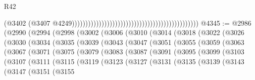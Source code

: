 \begin{lexlean}{R42}
\begin{coremodule}
{                                                                                              (@3402
                                                                                                (@3407
                                                                                                  @4249)))))))))))))))))))))))))))))))))))))))))))))))
@4345 := @2986
    (@2990
      (@2994
        (@2998
          (@3002
            (@3006
              (@3010
                (@3014
                  (@3018
                    (@3022
                      (@3026
                        (@3030
                          (@3034
                            (@3035
                              (@3039
                                (@3043
                                  (@3047
                                    (@3051
                                      (@3055
                                        (@3059
                                          (@3063
                                            (@3067
                                              (@3071
                                                (@3075
                                                  (@3079
                                                    (@3083
                                                      (@3087
                                                        (@3091
                                                          (@3095
                                                            (@3099
                                                              (@3103
                                                                (@3107
                                                                  (@3111
                                                                    (@3115
                                                                      (@3119
                                                                        (@3123
                                                                          (@3127
                                                                            (@3131
                                                                              (@3135
                                                                                (@3139
                                                                                  (@3143
                                                                                    (@3147
                                                                                      (@3151
                                                                                        (@3155
}
\end{coremodule}
\end{lexlean}
